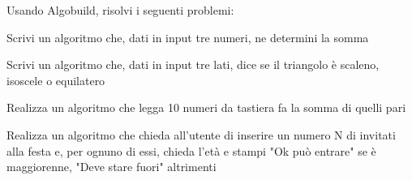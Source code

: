 \documentclass[addpoints]{exam}
\begin{document}
 
 
\vspace{5mm}
 
 
\vspace{5mm}
 
 
\vspace{10mm}
 Usando Algobuild, risolvi i seguenti problemi:
\begin{questions}

\question[2] Scrivi un algoritmo che, dati in input tre numeri, ne determini la somma

\question[2] Scrivi un algoritmo che, dati in input tre lati, dice se il triangolo è scaleno, isoscele o equilatero

\question[3] Realizza un algoritmo che legga 10 numeri da tastiera fa la somma di quelli pari

\question[3] Realizza un algoritmo che chieda all'utente di inserire un numero N di invitati alla festa e, per ognuno di essi, chieda l'età e stampi "Ok può entrare" se è maggiorenne, "Deve stare fuori" altrimenti

\end{questions}

\begin{center}
	\gradetable[h][questions]
\end{center}
\end{document}
